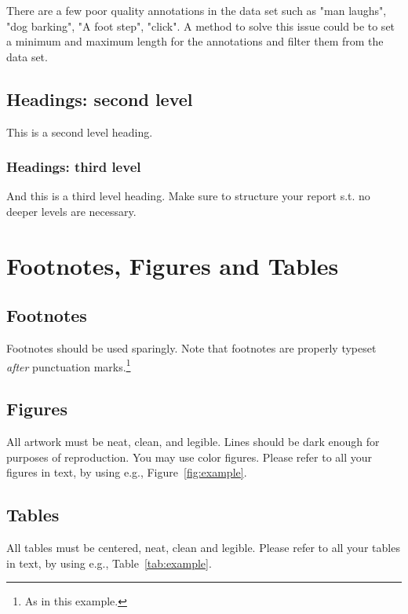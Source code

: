 \documentclass{article}
\begin{document}
There are a few poor quality annotations in the data set such as "man laughs", "dog barking", "A foot step", "click". A method to solve this issue could be to set a minimum and maximum length for the annotations and filter them from the data set.

\subsection{Headings: second level}

This is a second level heading. 

\subsubsection{Headings: third level}

And this is a third level heading. Make sure to structure your report s.t. no deeper levels are necessary. 

\section{Footnotes, Figures and Tables}

\subsection{Footnotes}
Footnotes should be used sparingly. Note that footnotes are properly typeset \emph{after} punctuation marks.\footnote{As in this example.}


\subsection{Figures}


All artwork must be neat, clean, and legible. Lines should be dark enough for
purposes of reproduction. You may use color figures. Please refer to all your figures in text, by using e.g., Figure~\ref{fig:example}. 

\subsection{Tables}
All tables must be centered, neat, clean and legible. Please refer to all your tables in text, by using e.g., Table~\ref{tab:example}.
\end{document}
